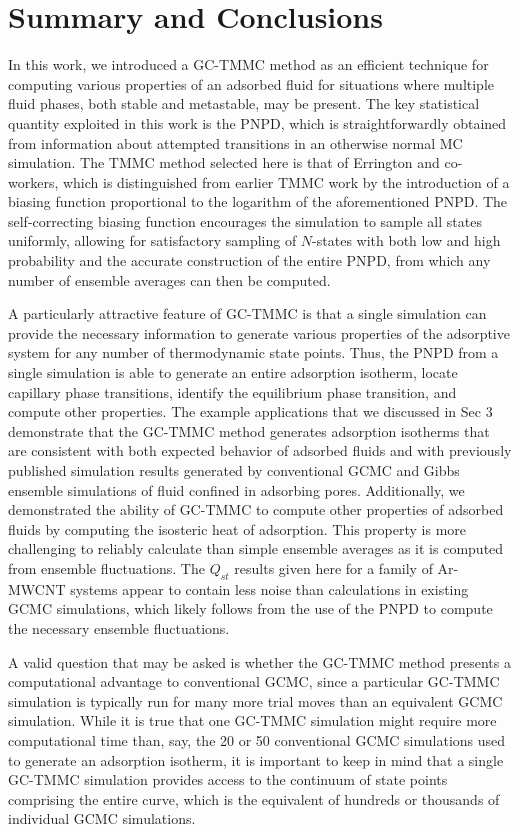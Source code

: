 \section{Summary and Conclusions}\label{sec:summary}

In this work, we introduced a GC-TMMC method as an efficient technique for computing various properties of an adsorbed fluid for situations where multiple fluid phases, both stable and metastable, may be present.
The key statistical quantity exploited in this work is the PNPD, which is straightforwardly obtained from information about attempted transitions in an otherwise normal MC simulation.
The TMMC method selected here is that of Errington and co-workers, which is distinguished from earlier TMMC work by the introduction of a biasing function proportional to the logarithm of the aforementioned PNPD.
The self-correcting biasing function encourages the simulation to sample all states uniformly, allowing for satisfactory sampling of $N$-states with both low and high probability and the accurate construction of the entire PNPD, from which any number of ensemble averages can then be computed.

A particularly attractive feature of GC-TMMC is that a single simulation can provide the necessary information to generate various properties of the adsorptive system for any number of thermodynamic state points.
Thus, the PNPD from a single simulation is able to generate an entire adsorption isotherm, locate capillary phase transitions, identify the equilibrium phase transition, and compute other properties.
The example applications that we discussed in Sec 3 demonstrate that the GC-TMMC method generates adsorption isotherms that are consistent with both expected behavior of adsorbed fluids and with previously published simulation results generated by conventional GCMC and Gibbs ensemble simulations of fluid confined in adsorbing pores.
Additionally, we demonstrated the ability of GC-TMMC to compute other properties of adsorbed fluids by computing the isosteric heat of adsorption.
This property is more challenging to reliably calculate than simple ensemble averages as it is computed from ensemble fluctuations.
The $Q_{st}$ results given here for a family of Ar-MWCNT systems appear to contain less noise than calculations in existing GCMC simulations, which likely follows from the use of the PNPD to compute the necessary ensemble fluctuations.

A valid question that may be asked is whether the GC-TMMC method presents a computational advantage to conventional GCMC, since a particular GC-TMMC simulation is typically run for many more trial moves than an equivalent GCMC simulation.
While it is true that one GC-TMMC simulation might require more computational time than, say, the 20 or 50 conventional GCMC simulations used to generate an adsorption isotherm, it is important to keep in mind that a single GC-TMMC simulation provides access to the continuum of state points comprising the entire curve, which is the equivalent of hundreds or thousands of individual GCMC simulations.

